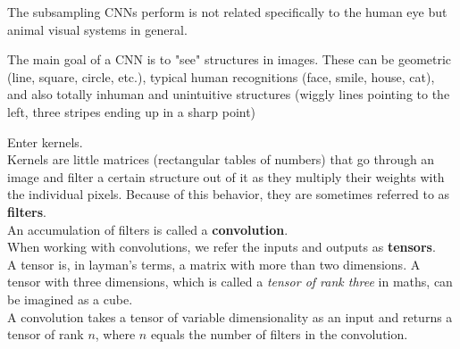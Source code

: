 The subsampling CNNs perform is not related specifically to the human eye but animal visual systems in general.  \cite{MasakazuMatsugu2003}  

The main goal of a CNN is to "see" structures in images.  
These can be geometric (line, square, circle, etc.),  
typical human recognitions (face, smile, house, cat),  
and also totally inhuman and unintuitive structures (wiggly lines pointing to the left, three stripes ending up in a sharp point)

Enter kernels.  \\
Kernels are little matrices (rectangular tables of numbers) that go through an image and filter a certain structure out of it as they multiply their weights with the individual pixels. Because of this behavior, they are sometimes referred to as \textbf{filters}. \\

An accumulation of filters is called a \textbf{convolution}. \\
When working with convolutions, we refer the inputs and outputs as \textbf{tensors}.\\
A tensor is, in layman's terms, a matrix with more than two dimensions. A tensor with three dimensions, which is called a \emph{tensor of rank three} in maths, can be imagined as a cube.\\
A convolution takes a tensor of variable dimensionality as an input and returns a tensor of rank $n$, where $n$ equals the number of filters in the convolution.